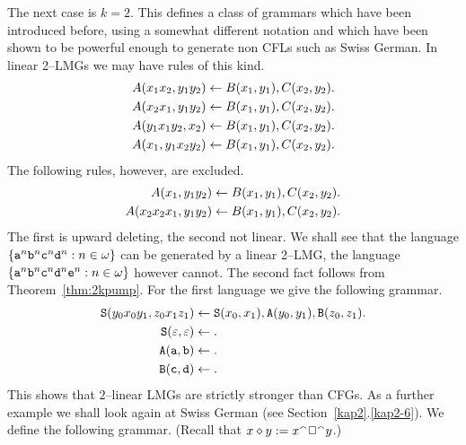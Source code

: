 The next case is $k = 2$. This defines a class of
grammars which have been introduced before, using a somewhat
different notation and which have been shown to be powerful
enough to generate non CFLs such as Swiss German. In linear 2--LMGs 
we may have rules of this kind.
\begin{equation}
\begin{split}
A(x_1x_2, y_1y_2) & \leftarrow B(x_1, y_1), C(x_2, y_2). \\
A(x_2x_1, y_1y_2) & \leftarrow B(x_1, y_1), C(x_2, y_2). \\
A(y_1x_1y_2, x_2) & \leftarrow B(x_1, y_1), C(x_2, y_2). \\
A(x_1, y_1x_2y_2) & \leftarrow B(x_1, y_1), C(x_2, y_2).
\end{split}
\end{equation}
The following rules, however, are excluded.
\begin{align}
A(x_1, y_1y_2) & \leftarrow B(x_1, y_1), C(x_2, y_2). \\
A(x_2x_2x_1, y_1y_2) & \leftarrow B(x_1, y_1), C(x_2, y_2).
\end{align}
The first is upward deleting, the second not linear. We shall see
that the language $\{\mbox{\tt a}^n\mbox{\tt b}^n\mbox{\tt c}^n
\mbox{\tt d}^n : n \in \omega\}$ can be generated by a linear
2--LMG, the language $\{\mbox{\tt a}^n \mbox{\tt b}^n %
\mbox{\tt c}^n\mbox{\tt d}^n\mbox{\tt e}^n : n \in \omega\}$
however cannot. The second fact follows from Theorem~\ref{thm:2kpump}. 
For the first language we give the following grammar.
\begin{equation}
\begin{split}
\mbox{\tt S}(y_0x_0y_1,z_0x_1z_1) & \leftarrow
\mbox{\tt S}(x_0,x_1), \mbox{\tt A}(y_0,y_1),
\mbox{\tt B}(z_0, z_1). \\
\mbox{\tt S}(\varepsilon, \varepsilon) & \leftarrow . \\
\mbox{\tt A}(\mbox{\tt a},\mbox{\tt b}) & \leftarrow . \\
\mbox{\tt B}(\mbox{\tt c},\mbox{\tt d}) & \leftarrow .
\end{split}
\end{equation}
This shows that $2$--linear LMGs are strictly stronger than
CFGs. As a further example we shall look again at Swiss German 
(see Section~\ref{kap2}.\ref{kap2-6}). We define the following 
grammar. (Recall that $x \oconc y := x^{\smallfrown}%
\Box^{\smallfrown}y$.) 

